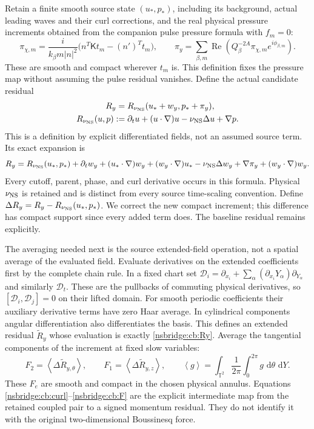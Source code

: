 \documentclass[11pt]{article}
\newcommand{\dd}{\,\mathrm d}
\newcommand{\av}[1]{\left\langle #1\right\rangle}
\begin{document}
Retain a finite smooth source state $(u_*,p_*)$, including its background,
actual leading waves and their curl corrections, and the real
physical pressure increments obtained from the companion pulse pressure
formula with $f_m=0$:
\[
 \pi_{\chi,m}=\frac{i}{k_\beta m|n|^2}
                  \bigl(n^T\mathsf Kt_m-(n')^Tt_m\bigr),\qquad
 \pi_y=\sum_{\beta,m}\operatorname{Re}
             (Q_\beta^{-2A}\pi_{\chi,m}e^{i\phi_{\beta,m}}).
\]
These are smooth and compact wherever $t_m$ is. This definition fixes the
pressure map without assuming the pulse residual vanishes.
Define the actual candidate residual
\begin{align}
 R_y={}&R_{\nu_{\rm NS}}(u_*+w_y,p_*+\pi_y), \nonumber\\
 R_{\nu_{\rm NS}}(u,p)
   :={}&\partial_tu+(u\cdot\nabla)u-\nu_{\rm NS}\Delta u+\nabla p .
 \label{nsbridge:cb:Ry}
\end{align}
This is a definition by explicit differentiated fields, not an assumed
source term. Its exact expansion is
\[
 R_y=R_{\nu_{\rm NS}}(u_*,p_*)
 +\partial_tw_y+(u_*\cdot\nabla)w_y+(w_y\cdot\nabla)u_*
 -\nu_{\rm NS}\Delta w_y+\nabla\pi_y
 +(w_y\cdot\nabla)w_y .
\]
Every cutoff, parent, phase, and curl derivative occurs in this formula.
Physical $\nu_{\rm NS}$ is retained and is distinct from every source
time-scaling convention. Define
$\Delta R_y=R_y-R_{\nu_{\rm NS}}(u_*,p_*)$.
We correct the new compact increment; this difference has compact support
since every added term does. The baseline residual remains explicitly.

The averaging needed next is the source extended-field operation, not a
spatial average of the evaluated field. Evaluate derivatives on the
extended coefficients first by the complete chain rule. In a fixed
chart set $\mathcal D_i=\partial_{x_i}
+\sum_\alpha(\partial_{x_i}Y_\alpha)\partial_{Y_\alpha}$ and similarly
$\mathcal D_t$. These are the pullbacks of commuting physical
derivatives, so $[\mathcal D_i,\mathcal D_j]=0$ on their lifted domain.
For smooth periodic coefficients their auxiliary derivative terms have
zero Haar average. In cylindrical components angular differentiation
also differentiates the basis. This defines an extended residual
$\widetilde R_y$ whose evaluation is exactly \eqref{nsbridge:cb:Ry}.
Average the tangential components of the increment at fixed slow variables:
\begin{equation}
 F_2=\av{\Delta\widetilde R_{y,\theta}},\qquad
 F_1=\av{\Delta\widetilde R_{y,z}},\qquad
 \av{g}=\int_{\mathbb T^2}\frac1{2\pi}
                    \int_0^{2\pi}g\,\dd\theta\,\dd Y . \label{nsbridge:cb:F}
\end{equation}
These $F_e$ are smooth and compact
in the chosen physical annulus. Equations \eqref{nsbridge:cb:curl}--\eqref{nsbridge:cb:F}
are the explicit intermediate map from the retained coupled pair to a
signed momentum residual. They do not identify it with the original
two-dimensional Boussinesq force.
\end{document}

